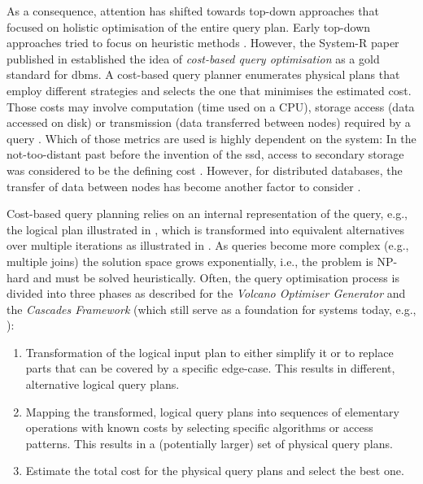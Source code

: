 As a consequence, attention has shifted towards top-down approaches that focused on holistic optimisation of the entire query plan. Early top-down approaches tried to focus on heuristic methods \cite{Jarke:1984Query}. However, the System-R paper \cite{Selinger:1979Access} published in \citeyear{Selinger:1979Access} established the idea of \emph{cost-based query optimisation} as a gold standard for \acrshort{dbms}. A cost-based query planner enumerates physical plans that employ different strategies and selects the one that minimises the estimated cost. Those costs may involve computation (time used on a CPU), storage access (data accessed on disk) or transmission (data transferred between nodes) required by a query \cite{Jarke:1984Query,Garcia:2009Database}. Which of those metrics are used is highly dependent on the system: In the not-too-distant past before the invention of the \acrfull{ssd}, access to secondary storage was considered to be the defining cost \cite{Garcia:2009Database}. However, for distributed databases, the transfer of data between nodes has become another factor to consider \cite{Bruno2013:Continuous}.

Cost-based query planning relies on an internal representation of the query, e.g., the logical plan illustrated in , which is transformed into equivalent alternatives over multiple iterations as illustrated in . As queries become more complex (e.g., multiple joins) the solution space grows exponentially, i.e., the problem is NP-hard and must be solved heuristically. Often, the query optimisation process is divided into three phases as described for the \emph{Volcano Optimiser Generator}  \cite{Jarke:1984Query,Graefe:1993Volcano} and the \emph{Cascades Framework} \cite{Graefe:1995Cascades} (which still serve as a foundation for systems today, e.g., \cite{Soliman:Orca2014,Begoli:2018Apache}):

\begin{enumerate}
    \item Transformation of the logical input plan to either simplify it or to replace parts that can be covered by a specific edge-case. This results in different, alternative logical query plans.
    \item Mapping the transformed, logical query plans into sequences of elementary operations with known costs by selecting specific algorithms or access patterns. This results in a (potentially larger) set of physical query plans.
    \item Estimate the total cost for the physical query plans and select the best one.
\end{enumerate}

